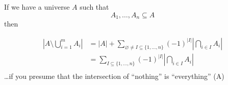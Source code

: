 If we have a universe $A$ such that
\[
  A_1,\ldots,A_n \subseteq A
\]then

\begin{align*}
  |A\setminus \bigcup\limits_{i=1}^m A_i| &=
  |A| + \sum_{\varnothing\neq I\subseteq\{1,\ldots,n\}}
    (-1)^{|I|}
    \left| \bigcap_{i\in I} A_i \right| \\
  &= \sum_{I\subseteq\{1,\ldots,n\}}
    (-1)^{|I|}
    \left| \bigcap_{i\in I} A_i \right| \\
\end{align*}
\dots if you presume that the intersection of ``nothing'' is ``everything'' (A)


